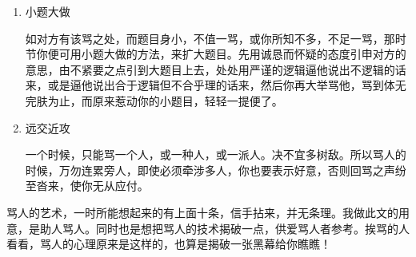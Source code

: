 \begin{enumerate}
\item 小题大做

\hspace{1.8em}如对方有该骂之处，而题目身小，不值一骂，或你所知不多，不足一骂，那时节你便可用小题大做的方法，来扩大题目。先用诚恳而怀疑的态度引申对方的意思，由不紧要之点引到大题目上去，处处用严谨的逻辑逼他说出不逻辑的话来，或是逼他说出合于逻辑但不合乎理的话来，然后你再大举骂他，骂到体无完肤为止，而原来惹动你的小题目，轻轻一提便了。

\item 远交近攻

\hspace{1.8em}一个时候，只能骂一个人，或一种人，或一派人。决不宜多树敌。所以骂人的时候，万勿连累旁人，即使必须牵涉多人，你也要表示好意，否则回骂之声纷至沓来，使你无从应付。

\end{enumerate}

\hspace{2em}骂人的艺术，一时所能想起来的有上面十条，信手拈来，并无条理。我做此文的用意，是助人骂人。同时也是想把骂人的技术揭破一点，供爱骂人者参考。挨骂的人看看，骂人的心理原来是这样的，也算是揭破一张黑幕给你瞧瞧！
